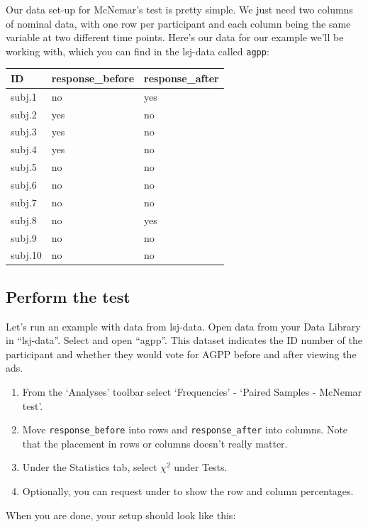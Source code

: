 \documentclass[
]{book}
\begin{document}
Our data set-up for McNemar's test is pretty simple. We just need two columns of nominal data, with one row per participant and each column being the same variable at two different time points. Here's our data for our example we'll be working with, which you can find in the lsj-data called \texttt{agpp}:

\begin{longtable}[]{@{}lll@{}}
\toprule
ID & response\_before & response\_after \\
\midrule
\endhead
subj.1 & no & yes \\
subj.2 & yes & no \\
subj.3 & yes & no \\
subj.4 & yes & no \\
subj.5 & no & no \\
subj.6 & no & no \\
subj.7 & no & no \\
subj.8 & no & yes \\
subj.9 & no & no \\
subj.10 & no & no \\
\bottomrule
\end{longtable}

\hypertarget{perform-the-test-5}{%
\subsection{Perform the test}\label{perform-the-test-5}}

Let's run an example with data from lsj-data. Open data from your Data Library in ``lsj-data''. Select and open ``agpp''. This dataset indicates the ID number of the participant and whether they would vote for AGPP before and after viewing the ads.

\begin{enumerate}
\def\labelenumi{\arabic{enumi}.}
\item
  From the `Analyses' toolbar select `Frequencies' - `Paired Samples - McNemar test'.
\item
  Move \texttt{response\_before} into rows and \texttt{response\_after} into columns. Note that the placement in rows or columns doesn't really matter.
\item
  Under the Statistics tab, select \(\chi^2\) under Tests.
\item
  Optionally, you can request under to show the row and column percentages.
\end{enumerate}

When you are done, your setup should look like this:
\end{document}
